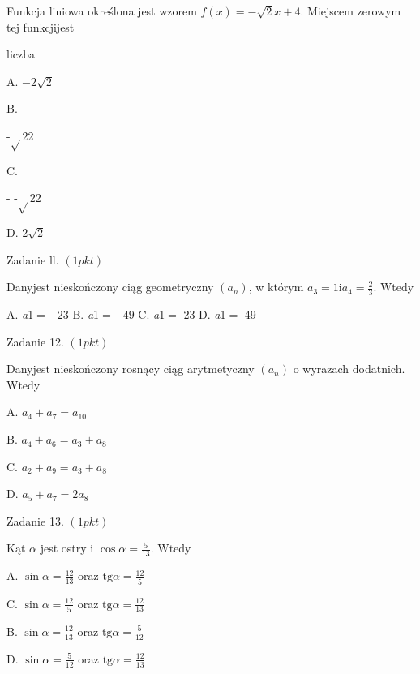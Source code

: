 \documentclass[a4paper,12pt]{article}
\begin{document}
Funkcja liniowa określona jest wzorem $f(x)=-\sqrt{2}x+4$. Miejscem zerowym tej funkcjijest

liczba

A. $-2\sqrt{2}$

B.

-$\sqrt{}$22

C.

- -$\sqrt{}$22

D. $2\sqrt{2}$

Zadanie ll. $(1pkt)$

Danyjest nieskończony ciąg geometryczny $(a_{n})$, w którym $a_{3}=1 \displaystyle \mathrm{i}a_{4}=\frac{2}{3}$. Wtedy

A. {\it a}1$=- 23$ B. {\it a}1$=- 49$ C. {\it a}1$=$-23 D. {\it a}1$=$-49

Zadanie 12. $(1pkt)$

Danyjest nieskończony rosnący ciąg arytmetyczny $(a_{n})$ o wyrazach dodatnich. Wtedy

A. $a_{4}+a_{7}=a_{10}$

B. $a_{4}+a_{6}=a_{3}+a_{8}$

C. $a_{2}+a_{9}=a_{3}+a_{8}$

D. $a_{5}+a_{7}=2a_{8}$

Zadanie 13. $(1pkt)$

Kąt $\alpha$ jest ostry i $\displaystyle \cos\alpha=\frac{5}{13}$. Wtedy

A. $\displaystyle \sin\alpha=\frac{12}{13}$ oraz $\displaystyle \mathrm{t}\mathrm{g}\alpha=\frac{12}{5}$

C. $\displaystyle \sin\alpha=\frac{12}{5}$ oraz $\displaystyle \mathrm{t}\mathrm{g}\alpha=\frac{12}{13}$

B. $\displaystyle \sin\alpha=\frac{12}{13}$ oraz $\displaystyle \mathrm{t}\mathrm{g}\alpha=\frac{5}{12}$

D. $\displaystyle \sin\alpha=\frac{5}{12}$ oraz $\displaystyle \mathrm{t}\mathrm{g}\alpha=\frac{12}{13}$
\end{document}
